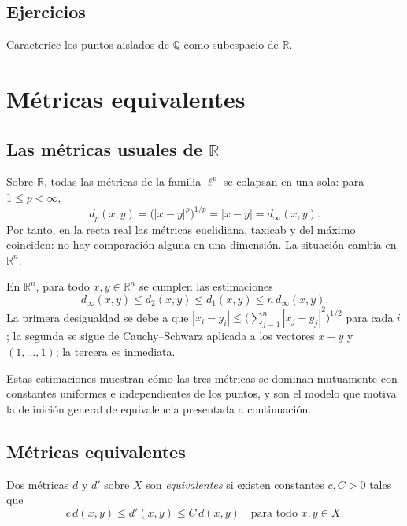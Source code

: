 \subsection{Ejercicios}

\begin{exercise}
Caracterice los puntos aislados de $\mathbb{Q}$ como subespacio de $\mathbb{R}$.
\end{exercise}

\section{Métricas equivalentes}

\subsection{Las métricas usuales de $\mathbb{R}$}

Sobre $\mathbb{R}$, todas las métricas de la familia $\ell^p$ se colapsan en una sola: para $1\leq p<\infty$,
\[
  d_p(x,y)=\bigl(|x-y|^p\bigr)^{1/p}=|x-y|=d_\infty(x,y).
\]
Por tanto, en la recta real las métricas euclidiana, taxicab y del máximo coinciden: no hay comparación alguna en una dimensión. La situación cambia en $\mathbb{R}^n$.

\begin{example}
\label{ej:comparacion-metricas-rn}
En $\mathbb{R}^n$, para todo $x,y\in\mathbb{R}^n$ se cumplen las estimaciones
\[
  d_\infty(x,y)\leq d_2(x,y)\leq d_1(x,y)\leq n\,d_\infty(x,y).
\]
La primera desigualdad se debe a que $|x_i-y_i|\leq\bigl(\sum_{j=1}^{n}|x_j-y_j|^2\bigr)^{1/2}$ para cada $i$; la segunda se sigue de Cauchy--Schwarz aplicada a los vectores $x-y$ y $(1,\dots,1)$; la tercera es inmediata.
\end{example}

Estas estimaciones muestran cómo las tres métricas se dominan mutuamente con constantes uniformes e independientes de los puntos, y son el modelo que motiva la definición general de equivalencia presentada a continuación.

\subsection{Métricas equivalentes}

\begin{definition}
\label{def:metricas-equivalentes}
Dos métricas $d$ y $d'$ sobre $X$ son \emph{equivalentes} si existen constantes $c,C>0$ tales que
\[
  c\,d(x,y)\leq d'(x,y)\leq C\,d(x,y)\quad\text{para todo }x,y\in X.
\]
\end{definition}

